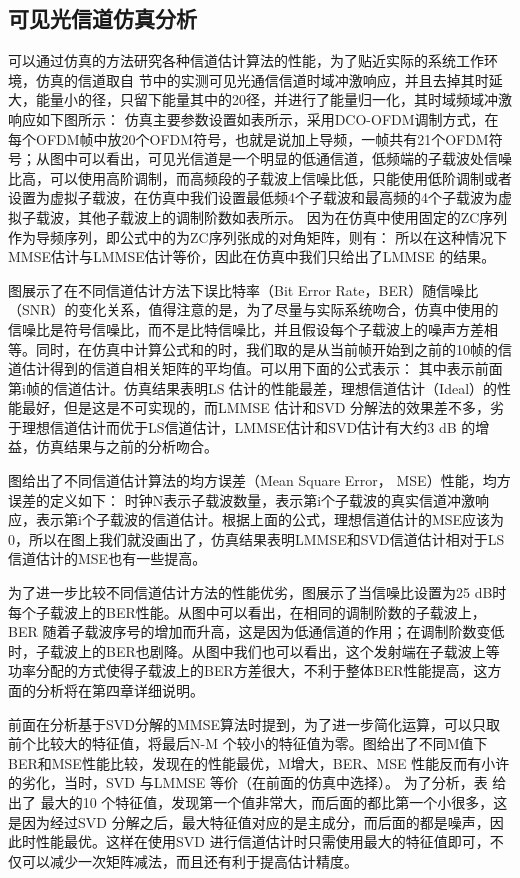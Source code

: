 \subsection{可见光信道仿真分析}
可以通过仿真的方法研究各种信道估计算法的性能，为了贴近实际的系统工作环境，仿真的信道取自 节中的实测可见光通信信道时域冲激响应，并且去掉其时延大，能量小的径，只留下能量其中的20径，并进行了能量归一化，其时域频域冲激响应如下图所示：
仿真主要参数设置如表所示，采用DCO-OFDM调制方式，在每个OFDM帧中放20个OFDM符号，也就是说加上导频，一帧共有21个OFDM符号；从图中可以看出，可见光信道是一个明显的低通信道，低频端的子载波处信噪比高，可以使用高阶调制，而高频段的子载波上信噪比低，只能使用低阶调制或者设置为虚拟子载波，在仿真中我们设置最低频4个子载波和最高频的4个子载波为虚拟子载波，其他子载波上的调制阶数如表所示。
因为在仿真中使用固定的ZC序列作为导频序列，即公式中的为ZC序列张成的对角矩阵，则有：
所以在这种情况下MMSE估计与LMMSE估计等价，因此在仿真中我们只给出了LMMSE 的结果。

图展示了在不同信道估计方法下误比特率（Bit Error Rate，BER）随信噪比（SNR）的变化关系，值得注意的是，为了尽量与实际系统吻合，仿真中使用的信噪比是符号信噪比，而不是比特信噪比，并且假设每个子载波上的噪声方差相等。同时，在仿真中计算公式和的时，我们取的是从当前帧开始到之前的10帧的信道估计得到的信道自相关矩阵的平均值。可以用下面的公式表示：
其中表示前面第i帧的信道估计。仿真结果表明LS 估计的性能最差，理想信道估计（Ideal）的性能最好，但是这是不可实现的，而LMMSE 估计和SVD 分解法的效果差不多，劣于理想信道估计而优于LS信道估计，LMMSE估计和SVD估计有大约3 dB 的增益，仿真结果与之前的分析吻合。


图给出了不同信道估计算法的均方误差（Mean Square Error， MSE）性能，均方误差的定义如下：
时钟N表示子载波数量，表示第i个子载波的真实信道冲激响应，表示第i个子载波的信道估计。根据上面的公式，理想信道估计的MSE应该为0，所以在图上我们就没画出了，仿真结果表明LMMSE和SVD信道估计相对于LS信道估计的MSE也有一些提高。

为了进一步比较不同信道估计方法的性能优劣，图展示了当信噪比设置为25 dB时每个子载波上的BER性能。从图中可以看出，在相同的调制阶数的子载波上，BER 随着子载波序号的增加而升高，这是因为低通信道的作用；在调制阶数变低时，子载波上的BER也剧降。从图中我们也可以看出，这个发射端在子载波上等功率分配的方式使得子载波上的BER方差很大，不利于整体BER性能提高，这方面的分析将在第四章详细说明。


前面在分析基于SVD分解的MMSE算法时提到，为了进一步简化运算，可以只取前个比较大的特征值，将最后N-M 个较小的特征值为零。图给出了不同M值下BER和MSE性能比较，发现在的性能最优，M增大，BER、MSE 性能反而有小许的劣化，当时，SVD 与LMMSE 等价（在前面的仿真中选择）。
为了分析，表 给出了 最大的10 个特征值，发现第一个值非常大，而后面的都比第一个小很多，这是因为经过SVD 分解之后，最大特征值对应的是主成分，而后面的都是噪声，因此时性能最优。这样在使用SVD 进行信道估计时只需使用最大的特征值即可，不仅可以减少一次矩阵减法，而且还有利于提高估计精度。
